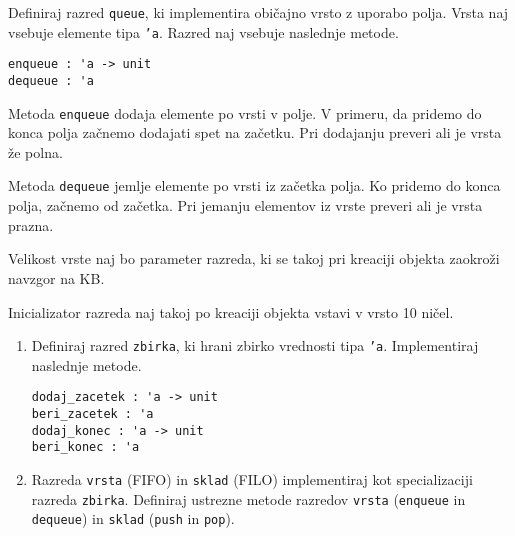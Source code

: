 \begin{ex}
Definiraj razred \lstinline{queue}, ki implementira obi\v cajno vrsto z uporabo polja. Vrsta naj vsebuje elemente tipa \texttt{'a}. Razred naj vsebuje naslednje metode.

\begin{lstlisting}
enqueue : 'a -> unit
dequeue : 'a
\end{lstlisting}

Metoda \texttt{enqueue} dodaja elemente po vrsti v polje. V primeru, da pridemo do konca polja za\v cnemo dodajati spet na za\v cetku. Pri dodajanju preveri ali je vrsta \v ze polna.
           
Metoda \texttt{dequeue} jemlje elemente po vrsti iz za\v cetka polja. Ko pridemo do konca polja, za\v cnemo od za\v cetka. Pri jemanju elementov iz vrste preveri ali je vrsta prazna.

Velikost vrste naj bo parameter razreda, ki se takoj pri kreaciji objekta zaokro\v zi navzgor na KB.

Inicializator razreda naj takoj po kreaciji objekta vstavi v vrsto 10 ni\v cel.
\end{ex}








\begin{ex}
\begin{enumerate}
\item Definiraj razred \lstinline{zbirka}, ki hrani zbirko vrednosti tipa \texttt{'a}. Implementiraj naslednje metode.
\begin{lstlisting}
dodaj_zacetek : 'a -> unit
beri_zacetek : 'a 
dodaj_konec : 'a -> unit
beri_konec : 'a  
\end{lstlisting}

\item Razreda \lstinline{vrsta} (FIFO) in \lstinline{sklad} (FILO) implementiraj kot specializaciji razreda \lstinline{zbirka}. Definiraj ustrezne metode razredov \lstinline{vrsta} (\texttt{enqueue} in \texttt{dequeue}) in \lstinline{sklad} (\texttt{push} in \texttt{pop}).
\end{enumerate}
\end{ex} 








